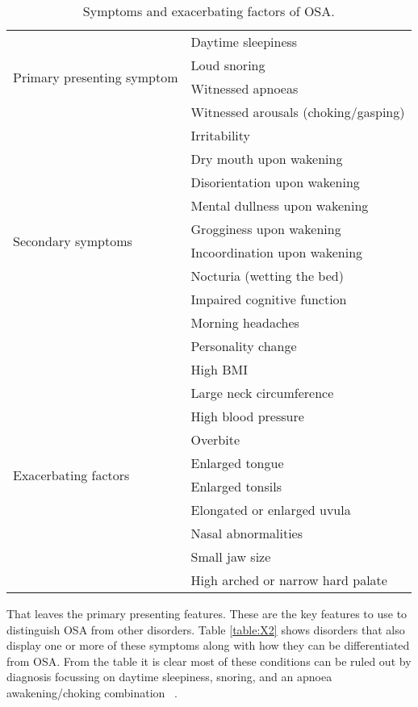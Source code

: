 \begin{table}
\centering
\begin{tabular}{l l}
\toprule
\multirow{4}{*}{Primary presenting symptom}&Daytime sleepiness\\ 
&Loud snoring\\ 
&Witnessed apnoeas\\ 
&Witnessed arousals (choking/gasping)\\ \midrule
\multirow{10}{*}{Secondary symptoms}&Irritability\\ 
&Dry mouth upon wakening\\ 
&Disorientation upon wakening\\ 
&Mental dullness upon wakening\\ 
&Grogginess upon wakening\\ 
&Incoordination upon wakening\\ 
&Nocturia (wetting the bed)\\ 
&Impaired cognitive function\\ 
&Morning headaches\\ 
&Personality change\\ \midrule
\multirow{10}{*}{Exacerbating factors}&High BMI\\ 
&Large neck circumference\\ 
&High blood pressure\\ 
&Overbite\\ 
&Enlarged tongue\\ 
&Enlarged tonsils\\ 
&Elongated or enlarged uvula\\ 
&Nasal abnormalities\\ 
&Small jaw size\\ 
&High arched or narrow hard palate\\ \bottomrule
\end{tabular}
\caption{Symptoms and exacerbating factors of OSA.}
\label{table:X4}
\end{table}

That leaves the primary presenting features. These are the key features to use to distinguish OSA from other disorders. Table \ref{table:X2} shows disorders that also display one or more of these symptoms along with how they can be differentiated from OSA. From the table it is clear most of these conditions can be ruled out by diagnosis focussing on daytime sleepiness, snoring, and an apnoea awakening/choking combination ~\cite{american2001international}.

